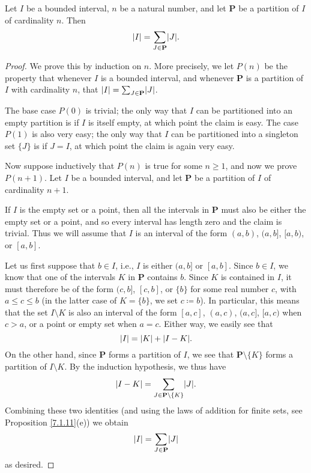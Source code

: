 \setcounter{theorem}{12}
\begin{theorem}\label{11.1.13}
    Let \(I\) be a bounded interval, \(n\) be a natural number, and let \(\mathbf{P}\) be a partition of \(I\) of cardinality \(n\).
    Then
    \[
        \abs*{I} = \sum_{J \in \mathbf{P}} \abs*{J}.
    \]
\end{theorem}

\begin{proof}
    We prove this by induction on \(n\).
    More precisely, we let \(P(n)\) be the property that whenever \(I\) is a bounded interval, and whenever \(\mathbf{P}\) is a partition of \(I\) with cardinality \(n\), that \(\abs*{I} = \sum_{J \in \mathbf{P}} \abs*{J}\).

    The base case \(P(0)\) is trivial;
    the only way that \(I\) can be partitioned into an empty partition is if \(I\) is itself empty, at which point the claim is easy.
    The case \(P(1)\) is also very easy;
    the only way that \(I\) can be partitioned into a singleton set \(\{J\}\) is if \(J = I\), at which point the claim is again very easy.

    Now suppose inductively that \(P(n)\) is true for some \(n \geq 1\), and now we prove \(P(n + 1)\).
    Let \(I\) be a bounded interval, and let \(\mathbf{P}\) be a partition of \(I\) of cardinality \(n + 1\).

    If \(I\) is the empty set or a point, then all the intervals in \(\mathbf{P}\) must also be either the empty set or a point, and so every interval has length zero and the claim is trivial.
    Thus we will assume that \(I\) is an interval of the form \((a, b)\), \((a, b]\), \([a, b)\), or \([a, b]\).

            Let us first suppose that \(b \in I\), i.e., \(I\) is either \((a, b]\) or \([a, b]\).
    Since \(b \in I\), we know that one of the intervals \(K\) in \(\mathbf{P}\) contains \(b\).
    Since \(K\) is contained in \(I\), it must therefore be of the form \((c, b]\), \([c, b]\), or \(\{b\}\) for some real number \(c\), with \(a \leq c \leq b\) (in the latter case of \(K = \{b\}\), we set \(c \coloneqq b\)).
    In particular, this means that the set \(I \setminus K\) is also an interval of the form \([a, c]\), \((a, c)\), \((a, c]\), \([a, c)\) when \(c > a\), or a point or empty set when \(a = c\).
    Either way, we easily see that
    \[
        \abs*{I} = \abs*{K} + \abs*{I - K}.
    \]
    On the other hand, since \(\mathbf{P}\) forms a partition of \(I\), we see that \(\mathbf{P} \setminus \{K\}\) forms a partition of \(I \setminus K\).
    By the induction hypothesis, we thus have
    \[
        \abs*{I - K} = \sum_{J \in \mathbf{P} \setminus \{K\}} \abs*{J}.
    \]
    Combining these two identities (and using the laws of addition for finite sets, see Proposition \ref{7.1.11}(e)) we obtain
    \[
        \abs*{I} = \sum_{J \in \mathbf{P}} \abs*{J}
    \]
    as desired.


\end{proof}
